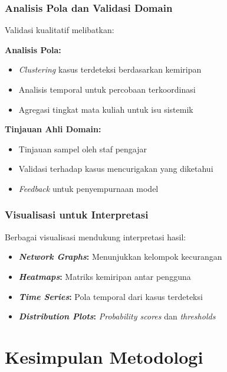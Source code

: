 \subsubsection{Analisis Pola dan Validasi Domain}
\label{sec:analisisPolaValidasi}

Validasi kualitatif melibatkan:

\textbf{Analisis Pola:}
\begin{itemize}
    \item \textit{Clustering} kasus terdeteksi berdasarkan kemiripan
    \item Analisis temporal untuk percobaan terkoordinasi
    \item Agregasi tingkat mata kuliah untuk isu sistemik
\end{itemize}

\textbf{Tinjauan Ahli Domain:}
\begin{itemize}
    \item Tinjauan sampel oleh staf pengajar
    \item Validasi terhadap kasus mencurigakan yang diketahui
    \item \textit{Feedback} untuk penyempurnaan model
\end{itemize}

\subsubsection{Visualisasi untuk Interpretasi}
\label{sec:visualisasiInterpretasi}

Berbagai visualisasi mendukung interpretasi hasil:

\begin{itemize}
    \item \textbf{\textit{Network Graphs}:} Menunjukkan kelompok kecurangan
    \item \textbf{\textit{Heatmaps}:} Matriks kemiripan antar pengguna
    \item \textbf{\textit{Time Series}:} Pola temporal dari kasus terdeteksi
    \item \textbf{\textit{Distribution Plots}:} \textit{Probability scores} dan \textit{thresholds}
\end{itemize}

\section{Kesimpulan Metodologi}
\label{sec:kesimpulanBab3}

